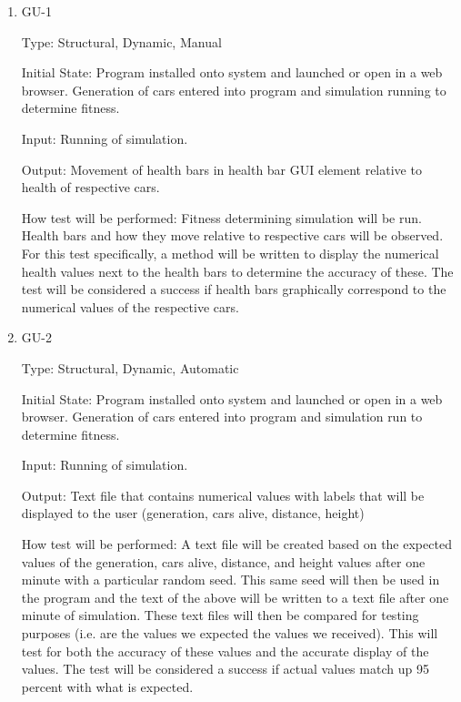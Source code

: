 \documentclass[12pt, titlepage]{article}
\begin{document}
\begin{enumerate}

\item{GU-1\\}

Type: Structural, Dynamic, Manual
					
Initial State: Program installed onto system and launched or open in a web 
browser. Generation of cars entered into program and simulation running to 
determine fitness.
					
Input: Running of simulation.
					
Output: Movement of health bars in health bar GUI element relative to health of 
respective cars.
					
How test will be performed: Fitness determining simulation will be run. Health 
bars and how they move relative to respective cars will be observed. For this 
test specifically, a method will be written to display the numerical health 
values next to the health bars to determine the accuracy of these. The test will 
be considered a success if health bars graphically correspond to the numerical 
values of the respective cars. 
					
\item{GU-2\\}

Type: Structural, Dynamic, Automatic
					
Initial State: Program installed onto system and launched or open in a web 
browser. Generation of cars entered into program and simulation run to determine 
fitness.
					
Input: Running of simulation.
					
Output: Text file that contains numerical values with labels that will be 
displayed to the user (generation, cars alive, distance, height)
					
How test will be performed: A text file will be created based on the expected 
values of the generation, cars alive, distance, and height values after one 
minute with a particular random seed. This same seed will then be used in the 
program and the text of the above will be written to a text file after one 
minute of simulation. These text files will then be compared for testing 
purposes (i.e. are the values we expected the values we received). This will 
test for both the accuracy of these values and the accurate display of the 
values. The test will be considered a success if actual values match up 95 
percent with what is expected.

\end{enumerate}
\end{document}
